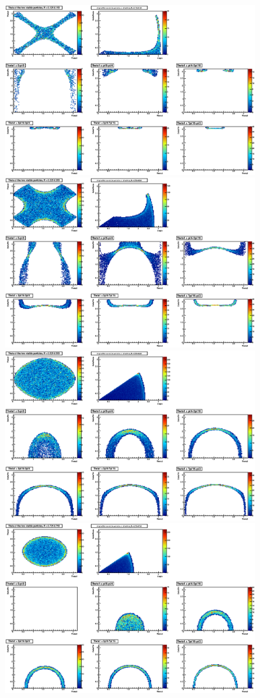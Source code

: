 \documentclass{fheadnote}
\begin{document}
\begin{landscape}
\begin{figure}[htbp]
   \centering
   \includegraphics[width=11cm]{Figures/MRToy12_RPhaseSpace_SmallR}
   \includegraphics[width=11cm]{Figures/MRToy12_RPhaseSpace_IntermediateR}\\
   \includegraphics[width=11cm]{Figures/MRToy12_RPhaseSpace_LargeR}
   \includegraphics[width=11cm]{Figures/MRToy12_RPhaseSpace_HugeR}

\end{figure}
\end{landscape}
\end{document}
